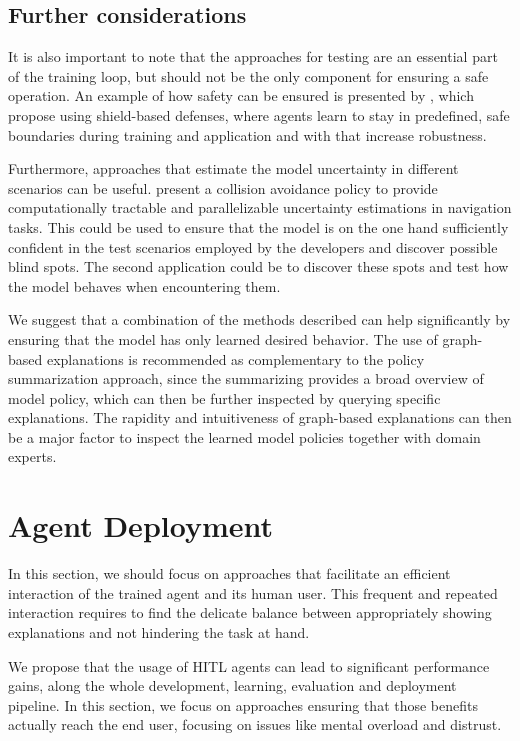 \documentclass[twoside,11pt]{article}
\begin{document}
\subsection{Further considerations}
It is also important to note that the approaches for testing are an essential part of the training loop, but should not be the only component for ensuring a safe operation. An example of how safety can be ensured is presented by \citet{XiongEtAl:2020:Robustness}, which propose using shield-based defenses, where agents learn to stay in predefined, safe boundaries during training and application and with that increase robustness.

Furthermore, approaches that estimate the model uncertainty in different scenarios can be useful. \cite{LuetjensEverettHow:2018:RLModelUncertainty} present a collision avoidance policy to provide computationally tractable and parallelizable uncertainty estimations in navigation tasks. This could be used to ensure that the model is on the one hand sufficiently confident in the test scenarios employed by the developers and discover possible blind spots. The second application could be to discover these spots and test how the model behaves when encountering them.

We suggest that a combination of the methods described can help significantly by ensuring that the model has only learned desired behavior. The use of graph-based explanations is recommended as complementary to the policy summarization approach, since the summarizing provides a broad overview of model policy, which can then be further inspected by querying specific explanations. The rapidity and intuitiveness of graph-based explanations can then be a major factor to inspect the learned model policies together with domain experts.

\section{Agent Deployment}

In this section, we should focus on approaches that facilitate an efficient interaction of the trained agent and its human user. This frequent and repeated interaction requires to find the delicate balance between appropriately showing explanations and not hindering the task at hand.

We propose that the usage of HITL agents can lead to significant performance gains, along the whole development, learning, evaluation and deployment pipeline. In this section, we focus on approaches ensuring that those benefits actually reach the end user, focusing on issues like mental overload and distrust.
\end{document}
